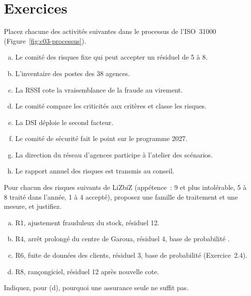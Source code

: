 \section*{Exercices}

\begin{boxexo}[title={\ding{45}\quad Exercice~3.1. Où en est-on dans le processus~? \niveaubase}]
Placez chacune des activités suivantes dans le processus de l'ISO~31000
(Figure~\ref{fig:c03-processus}).
\begin{enumerate}[(a)]
    \item Le comité des risques fixe qui peut accepter un résiduel de 5 à 8.
    \item L'inventaire des postes des 38 agences.
    \item La RSSI cote la vraisemblance de la fraude au virement.
    \item Le comité compare les criticités aux critères et classe les
          risques.
    \item La DSI déploie le second facteur.
    \item Le comité de sécurité fait le point sur le programme 2027.
    \item La direction du réseau d'agences participe à l'atelier des
          scénarios.
    \item Le rapport annuel des risques est transmis au conseil.
\end{enumerate}
\end{boxexo}

\begin{boxexo}[title={\ding{45}\quad Exercice~3.2. Choisir un traitement \niveaumoyen}]
Pour chacun des risques suivants de LiZbiZ (appétence~: 9 et plus
intolérable, 5 à 8 traité dans l'année, 1 à 4 accepté), proposez une
famille de traitement et une mesure, et justifiez.
\begin{enumerate}[(a)]
    \item R1, ajustement frauduleux du stock, résiduel 12.
    \item R4, arrêt prolongé du centre de Garoua, résiduel 4, base de
          probabilité \OUI{}.
    \item R6, fuite de données des clients, résiduel 3, base de probabilité
          \NEK{} (Exercice~2.4).
    \item R8, rançongiciel, résiduel 12 après nouvelle cote.
\end{enumerate}
Indiquez, pour (d), pourquoi une assurance seule ne suffit pas.
\end{boxexo}

